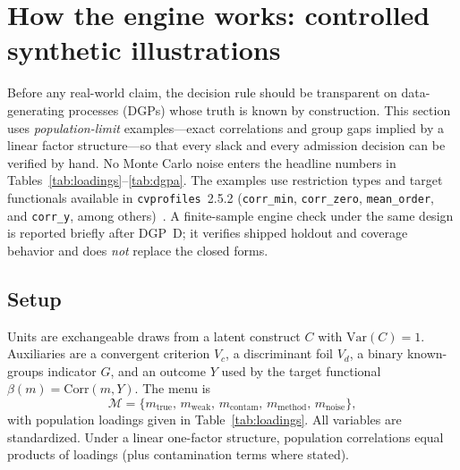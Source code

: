 \documentclass[10pt,letterpaper]{article}
\newcommand{\cvp}{\texttt{cvprofiles}}
\newcommand{\M}{\ensuremath{\mathcal{M}}}
\begin{document}
\section{How the engine works: controlled synthetic illustrations}
\label{sec:dgp}
Before any real-world claim, the decision rule should be transparent on data-generating processes (DGPs) whose truth is known by construction.
This section uses \emph{population-limit} examples---exact correlations and group gaps implied by a linear factor structure---so that every slack and every admission decision can be verified by hand.
No Monte Carlo noise enters the headline numbers in Tables~\ref{tab:loadings}--\ref{tab:dgpa}.
The examples use restriction types and target functionals available in \cvp{}~2.5.2 (\texttt{corr\_min}, \texttt{corr\_zero}, \texttt{mean\_order}, and \texttt{corr\_y}, among others)~\cite{cvprofiles}.
A finite-sample engine check under the same design is reported briefly after DGP~D; it verifies shipped holdout and coverage behavior and does \emph{not} replace the closed forms.

\subsection{Setup}
Units are exchangeable draws from a latent construct $C$ with $\mathrm{Var}(C)=1$.
Auxiliaries are a convergent criterion $V_{\!c}$, a discriminant foil $V_{\!d}$, a binary known-groups indicator $G$, and an outcome $Y$ used by the target functional $\beta(m)=\mathrm{Corr}(m,Y)$.
The menu is
\begin{equation}
\M=\bigl\{m_{\mathrm{true}},\, m_{\mathrm{weak}},\, m_{\mathrm{contam}},\, m_{\mathrm{method}},\, m_{\mathrm{noise}}\bigr\},
\label{eq:synthmenu}
\end{equation}
with population loadings given in Table~\ref{tab:loadings}.
All variables are standardized.
Under a linear one-factor structure, population correlations equal products of loadings (plus contamination terms where stated).
\end{document}

